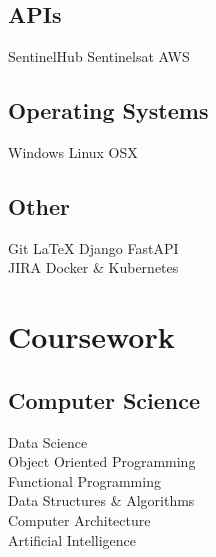 \documentclass[letterpaper]{AMcEnaneyResume} %
\begin{document}
\begin{minipage}[t]{0.33\textwidth}
        \sectionspace

    \subsection{APIs}

        \textbullet{} SentinelHub \textbullet{} Sentinelsat \textbullet{} AWS \\
        
        \sectionspace

    \subsection{Operating Systems}
        \textbullet{} Windows \textbullet{} Linux \textbullet{} OSX
        
        \sectionspace

    \subsection{Other}
        \textbullet{} Git \textbullet{} \LaTeX \textbullet{} Django \textbullet{} FastAPI \\
        \textbullet{} JIRA \textbullet{} Docker \& Kubernetes

    \sectionspace %


\section{Coursework}


    \subsection{Computer Science}

        \textbullet{} Data Science \\
        \textbullet{} Object Oriented Programming \\
        \textbullet{} Functional Programming \\
        \textbullet{} Data Structures \& Algorithms \\
        \textbullet{} Computer Architecture \\
        \textbullet{} Artificial Intelligence \\
        

\end{minipage}
\end{document}
